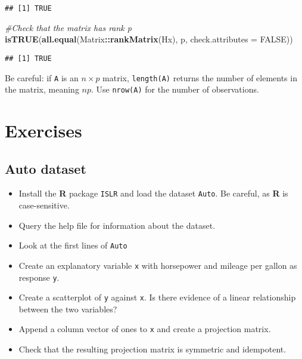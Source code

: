 \documentclass[]{book}
\newenvironment{Shaded}{\begin{snugshade}}{\end{snugshade}}
\newcommand{\CommentTok}[1]{\textcolor[rgb]{0.56,0.35,0.01}{\textit{#1}}}
\newcommand{\DataTypeTok}[1]{\textcolor[rgb]{0.13,0.29,0.53}{#1}}
\newcommand{\KeywordTok}[1]{\textcolor[rgb]{0.13,0.29,0.53}{\textbf{#1}}}
\newcommand{\NormalTok}[1]{#1}
\newcommand{\OperatorTok}[1]{\textcolor[rgb]{0.81,0.36,0.00}{\textbf{#1}}}
\newcommand{\OtherTok}[1]{\textcolor[rgb]{0.56,0.35,0.01}{#1}}
\providecommand{\tightlist}{%
  \setlength{\itemsep}{0pt}\setlength{\parskip}{0pt}}
\theoremstyle{definition}
\theoremstyle{definition}
\theoremstyle{definition}
\theoremstyle{remark}
\let\BeginKnitrBlock\begin \let\EndKnitrBlock\end
\begin{document}
\begin{verbatim}
## [1] TRUE
\end{verbatim}

\begin{Shaded}
\begin{Highlighting}[]
\CommentTok{#Check that the matrix has rank p}
\KeywordTok{isTRUE}\NormalTok{(}\KeywordTok{all.equal}\NormalTok{(Matrix}\OperatorTok{::}\KeywordTok{rankMatrix}\NormalTok{(Hx), p, }\DataTypeTok{check.attributes =} \OtherTok{FALSE}\NormalTok{))}
\end{Highlighting}
\end{Shaded}

\begin{verbatim}
## [1] TRUE
\end{verbatim}

\BeginKnitrBlock{rmdcaution}
Be careful: if \texttt{A} is an \(n \times p\) matrix, \texttt{length(A)} returns the number of elements in the matrix, meaning \(np\). Use \texttt{nrow(A)} for the number of observations.
\EndKnitrBlock{rmdcaution}

\hypertarget{exercises}{%
\section{Exercises}\label{exercises}}

\hypertarget{auto-dataset}{%
\subsection{Auto dataset}\label{auto-dataset}}

\begin{itemize}
\tightlist
\item
  Install the \textbf{R} package \texttt{ISLR} and load the dataset \texttt{Auto}. Be careful, as \textbf{R} is case-sensitive.
\item
  Query the help file for information about the dataset.
\item
  Look at the first lines of \texttt{Auto}
\item
  Create an explanatory variable \texttt{x} with horsepower and mileage per gallon as response \texttt{y}.
\item
  Create a scatterplot of \texttt{y} against \texttt{x}. Is there evidence of a linear relationship between the two variables?
\item
  Append a column vector of ones to \texttt{x} and create a projection matrix.
\item
  Check that the resulting projection matrix is symmetric and idempotent.
\end{itemize}
\end{document}
